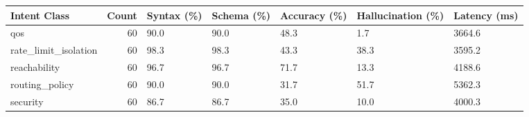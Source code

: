 \begin{tabular}{lrlllll}
\toprule
Intent Class & Count & Syntax (\%) & Schema (\%) & Accuracy (\%) & Hallucination (\%) & Latency (ms) \\
\midrule
qos & 60 & 90.0 & 90.0 & 48.3 & 1.7 & 3664.6 \\
rate\_limit\_isolation & 60 & 98.3 & 98.3 & 43.3 & 38.3 & 3595.2 \\
reachability & 60 & 96.7 & 96.7 & 71.7 & 13.3 & 4188.6 \\
routing\_policy & 60 & 90.0 & 90.0 & 31.7 & 51.7 & 5362.3 \\
security & 60 & 86.7 & 86.7 & 35.0 & 10.0 & 4000.3 \\
\bottomrule
\end{tabular}
